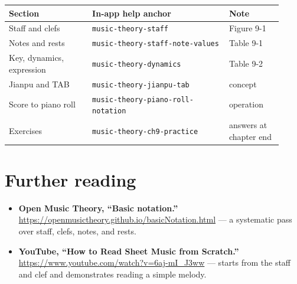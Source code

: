 \begin{center}
\small
\begin{tabular}{p{0.28\linewidth}p{0.46\linewidth}p{0.18\linewidth}}
\toprule
Section & In-app help anchor & Note \\
\midrule
Staff and clefs & \texttt{music-theory-staff} & Figure 9-1 \\
Notes and rests & \texttt{music-theory-staff-note-values} & Table 9-1 \\
Key, dynamics, expression & \texttt{music-theory-dynamics} & Table 9-2 \\
Jianpu and TAB & \texttt{music-theory-jianpu-tab} & concept \\
Score to piano roll & \texttt{music-theory-piano-roll-notation} & operation \\
Exercises & \texttt{music-theory-ch9-practice} & answers at chapter end \\
\bottomrule
\end{tabular}
\end{center}

\section*{Further reading}
\begin{itemize}
  \item \textbf{Open Music Theory, “Basic notation.”} \url{https://openmusictheory.github.io/basicNotation.html} — a systematic pass over staff, clefs, notes, and rests.
  \item \textbf{YouTube, “How to Read Sheet Music from Scratch.”} \url{https://www.youtube.com/watch?v=6aj-mI_J3ww} — starts from the staff and clef and demonstrates reading a simple melody.
\end{itemize}

